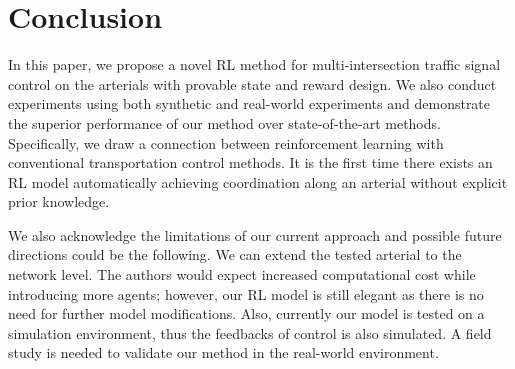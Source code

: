 \section{Conclusion}
In this paper, we propose a novel RL method for multi-intersection traffic signal control on the arterials with provable state and reward design. We also conduct experiments using both synthetic and real-world experiments and demonstrate the superior performance of our method over state-of-the-art methods. Specifically, we draw a connection between reinforcement learning with conventional transportation control methods. It is the first time there exists an RL model automatically achieving coordination along an arterial without explicit prior knowledge. 
 
 We also acknowledge the limitations of our current approach and possible future directions could be the following. We can extend the tested arterial to the network level. The authors would expect increased computational cost while introducing more agents; however, our RL model is still elegant as there is no need for further model modifications. Also, currently our model is tested on a simulation environment, thus the feedbacks of control is also simulated. A field study is needed to validate our method in the real-world environment.